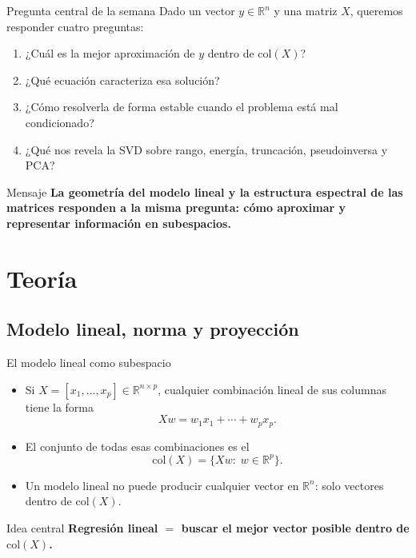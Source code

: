 \begin{frame}{Pregunta central de la semana}
Dado un vector $y\in\mathbb{R}^n$ y una matriz $X$, queremos responder cuatro preguntas:
\begin{enumerate}\small
  \item ¿Cuál es la mejor aproximación de $y$ dentro de $\mathrm{col}(X)$?
  \item ¿Qué ecuación caracteriza esa solución?
  \item ¿Cómo resolverla de forma estable cuando el problema está mal condicionado?
  \item ¿Qué nos revela la SVD sobre rango, energía, truncación, pseudoinversa y PCA?
\end{enumerate}
\vspace{0.3em}
\begin{block}{Mensaje}
\centering
\textbf{La geometría del modelo lineal y la estructura espectral de las matrices responden a la misma pregunta: cómo aproximar y representar información en subespacios.}
\end{block}
\end{frame}

\section[Teoría]{Teoría\label{sec:teoria-w07-final}}

\subsection{Modelo lineal, norma y proyección}

\begin{frame}{El modelo lineal como subespacio}
\begin{itemize}\small
  \item Si $X=[x_1,\dots,x_p]\in\mathbb{R}^{n\times p}$, cualquier combinación lineal de sus columnas tiene la forma
  \[
    Xw = w_1x_1 + \cdots + w_p x_p.
  \]
  \item El conjunto de todas esas combinaciones es el 
  \[
    \mathrm{col}(X)=\{Xw:\; w\in\mathbb{R}^p\}.
  \]
  \item Un modelo lineal no puede producir cualquier vector en $\mathbb{R}^n$: solo vectores dentro de $\mathrm{col}(X)$.
\end{itemize}
\vspace{0.25em}
\begin{block}{Idea central}
\centering
\textbf{Regresión lineal $=$ buscar el mejor vector posible dentro de $\mathrm{col}(X)$.}
\end{block}
\end{frame}

